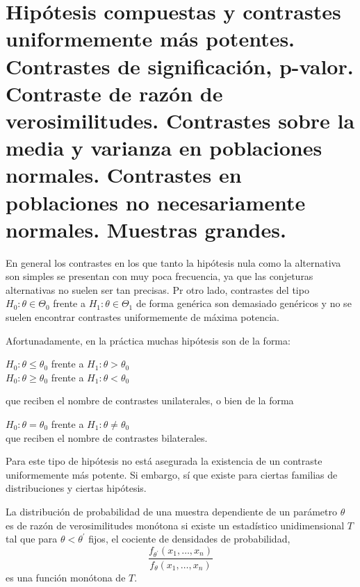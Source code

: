 \chapter[Hip\'otesis compuestas y contrastes uniformemente m\'as potentes.]{Hip\'otesis compuestas y contrastes uniformemente m\'as potentes. \\
\normalsize Contrastes de significaci\'on, p-valor. Contraste de raz\'on de verosimilitudes. Contrastes sobre la media y varianza en poblaciones normales. Contrastes en poblaciones no necesariamente normales. Muestras grandes.}



En general los contrastes en los que tanto la hip\'otesis nula como la alternativa son simples se presentan con muy poca frecuencia, ya que las conjeturas alternativas no suelen ser tan precisas. Pr otro lado, contrastes del tipo $H_0:\theta\in\Theta_0$ frente a $H_1:\theta\in\Theta_1$ de forma gen\'erica son demasiado gen\'ericos y no se suelen encontrar contrastes uniformemente de m\'axima potencia.

Afortunadamente, en la pr\'actica muchas hip\'otesis son de la forma:


{\addtolength{\leftskip}{50mm}
$H_0:\theta\leq\theta_0$ frente a $H_1:\theta>\theta_0$\\
$H_0:\theta\geq\theta_0$ frente a $H_1:\theta<\theta_0$
}

que reciben el nombre de contrastes unilaterales, o bien de la forma


{\addtolength{\leftskip}{50mm}
$H_0:\theta=\theta_0$ frente a $H_1:\theta\neq\theta_0$
}\\
que reciben el nombre de contrastes bilaterales.

Para este tipo de hip\'otesis no est\'a asegurada la existencia de un contraste uniformemente m\'as potente. Si embargo, s\'i que existe para ciertas familias de distribuciones y ciertas hip\'otesis.

\begin{definicion}
La distribuci\'on de probabilidad de una muestra dependiente de un par\'ametro $\theta$ es de raz\'on de verosimilitudes mon\'otona si existe un estad\'istico unidimensional $T$ tal que para $\theta<\theta^{\prime}$ fijos, el cociente de densidades de probabilidad,
\begin{equation*}
\dfrac{f_{\theta^{\prime}}(x_1,\ldots,x_n)}{f_{\theta}(x_1,\ldots,x_n)}
\end{equation*}
es una funci\'on mon\'otona de $T$.
\end{definicion}

